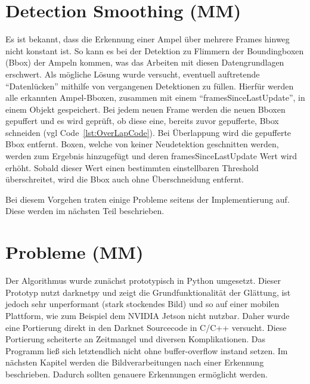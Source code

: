 \documentclass[a4paper,oneside,12pt]{report}
\begin{document}
\begin{onehalfspace}
		\section{Detection Smoothing (MM)}
		Es ist bekannt, dass die Erkennung einer Ampel über mehrere Frames hinweg nicht konstant ist. So kann es bei der Detektion zu Flimmern der Boundingboxen (Bbox) der Ampeln kommen, was das Arbeiten mit diesen Datengrundlagen erschwert.\newline
		Als mögliche Lösung wurde versucht, eventuell auftretende "`Datenlücken"' mithilfe von vergangenen Detektionen zu füllen. Hierfür werden alle erkannten Ampel-Bboxen, zusammen mit einem "`framesSinceLastUpdate"', in einem Objekt gespeichert. Bei jedem neuen Frame werden die neuen Bboxen gepuffert und es wird geprüft, ob diese eine, bereits zuvor gepufferte, Bbox schneiden (vgl Code~\ref{lst:OverLapCode}). Bei Überlappung wird die gepufferte Bbox entfernt. Boxen, welche von keiner Neudetektion geschnitten werden, werden zum Ergebnis hinzugefügt und deren framesSinceLastUpdate Wert wird erhöht. Sobald dieser Wert einen bestimmten einstellbaren Threshold überschreitet, wird die Bbox auch ohne Überschneidung entfernt.
		
		Bei diesem Vorgehen traten einige Probleme seitens der Implementierung auf. Diese werden im nächsten Teil beschrieben.
		\section{Probleme (MM)}
		Der Algorithmus wurde zunächst prototypisch in Python umgesetzt. Dieser Prototyp nutzt darknetpy und zeigt die Grundfunktionalität der Glättung, ist jedoch sehr unperformant (stark stockendes Bild) und so auf einer mobilen Plattform, wie zum Beispiel dem NVIDIA Jetson nicht nutzbar. Daher wurde eine Portierung direkt in den Darknet Sourcecode in C/C++ versucht. Diese Portierung scheiterte an Zeitmangel und diversen Komplikationen. Das Programm ließ sich letztendlich nicht ohne buffer-overflow instand setzen. Im nächsten Kapitel werden die Bildverarbeitungen nach einer Erkennung beschrieben. Dadurch sollten genauere Erkennungen ermöglicht werden.
	\end{onehalfspace}
\end{document}
